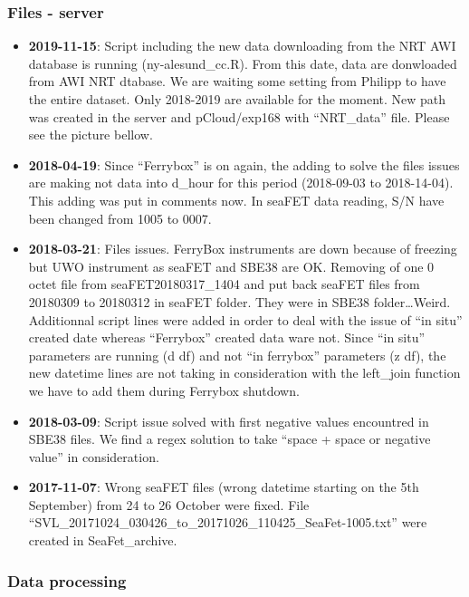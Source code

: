 \documentclass[
]{article}
\providecommand{\tightlist}{%
  \setlength{\itemsep}{0pt}\setlength{\parskip}{0pt}}
\begin{document}
\hypertarget{files---server}{%
\subsubsection{\texorpdfstring{\textbf{Files -
server}}{Files - server}}\label{files---server}}

\begin{itemize}
\tightlist
\item
  \textbf{2019-11-15}: Script including the new data downloading from
  the NRT AWI database is running (ny-alesund\_cc.R). From this date,
  data are donwloaded from AWI NRT dtabase. We are waiting some setting
  from Philipp to have the entire dataset. Only 2018-2019 are available
  for the moment. New path was created in the server and pCloud/exp168
  with ``NRT\_data'' file. Please see the picture bellow.
\item
  \textbf{2018-04-19}: Since ``Ferrybox'' is on again, the adding to
  solve the files issues are making not data into d\_hour for this
  period (2018-09-03 to 2018-14-04). This adding was put in comments
  now. In seaFET data reading, S/N have been changed from 1005 to 0007.
\item
  \textbf{2018-03-21}: Files issues. FerryBox instruments are down
  because of freezing but UWO instrument as seaFET and SBE38 are OK.
  Removing of one 0 octet file from seaFET20180317\_1404 and put back
  seaFET files from 20180309 to 20180312 in seaFET folder. They were in
  SBE38 folder\ldots Weird. Additionnal script lines were added in order
  to deal with the issue of ``in situ'' created date whereas
  ``Ferrybox'' created data ware not. Since ``in situ'' parameters are
  running (d df) and not ``in ferrybox'' parameters (z df), the new
  datetime lines are not taking in consideration with the left\_join
  function we have to add them during Ferrybox shutdown.
\item
  \textbf{2018-03-09}: Script issue solved with first negative values
  encountred in SBE38 files. We find a regex solution to take ``space +
  space or negative value'' in consideration.
\item
  \textbf{2017-11-07}: Wrong seaFET files (wrong datetime starting on
  the 5th September) from 24 to 26 October were fixed. File
  ``SVL\_20171024\_030426\_to\_20171026\_110425\_SeaFet-1005.txt'' were
  created in SeaFet\_archive.
\end{itemize}

\hypertarget{data-processing}{%
\subsubsection{Data processing}\label{data-processing}}
\end{document}
